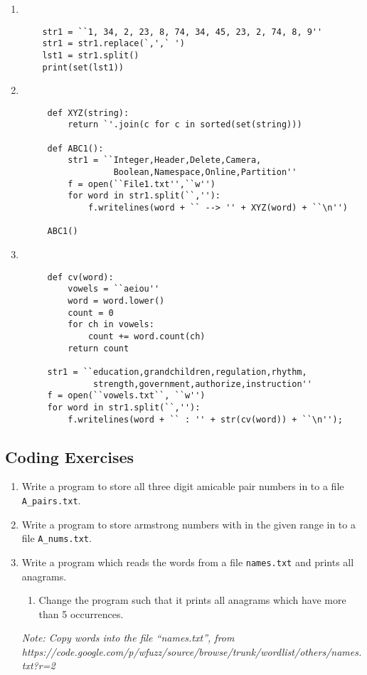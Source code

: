\documentclass[11pt,a4paper]{article}
\def\AnswerBox{\fbox{\begin{minipage}{4in}\hfill\vspace{0.5in}\end{minipage}}}
\begin{document}
\begin{enumerate}[label=\bfseries Program \arabic*:]
   \item ~
    \begin{lstlisting}
    str1 = ``1, 34, 2, 23, 8, 74, 34, 45, 23, 2, 74, 8, 9''
    str1 = str1.replace(`,',` ')
    lst1 = str1.split()
    print(set(lst1))
    \end{lstlisting}
    \AnswerBox

    \item ~
    \begin{lstlisting}
     def XYZ(string):
         return `'.join(c for c in sorted(set(string)))

     def ABC1():
         str1 = ``Integer,Header,Delete,Camera,
                  Boolean,Namespace,Online,Partition''
         f = open(``File1.txt'',``w'')
         for word in str1.split(``,''):
             f.writelines(word + `` --> '' + XYZ(word) + ``\n'')
    
     ABC1()
    \end{lstlisting}
    \AnswerBox
    \item ~
    \begin{lstlisting}
     def cv(word):
         vowels = ``aeiou''
         word = word.lower()
         count = 0
         for ch in vowels:
             count += word.count(ch)
         return count

     str1 = ``education,grandchildren,regulation,rhythm,
              strength,government,authorize,instruction''
     f = open(``vowels.txt``, ``w'')
     for word in str1.split(``,''):
         f.writelines(word + `` : '' + str(cv(word)) + ``\n'');  

    \end{lstlisting}
    \AnswerBox
\end{enumerate}
\subsection*{Coding Exercises}
\begin{enumerate}
    \item Write a program to store all three digit amicable pair numbers  in to a file \texttt{A\_pairs.txt}.
    \item Write a program to store armstrong numbers with in the given range in to a file \texttt{A\_nums.txt}.
    \item Write a program which reads the words from a file \texttt{names.txt} and prints all anagrams.
    \begin{enumerate}
     \item Change the program such that it prints all anagrams which have more than 5 occurrences.
    \end{enumerate}
    \emph{Note: Copy words into the file ``names.txt'', from\\ https://code.google.com/p/wfuzz/source/browse/trunk/wordlist/others/names.txt?r=2}
\end{enumerate}
\end{document}
